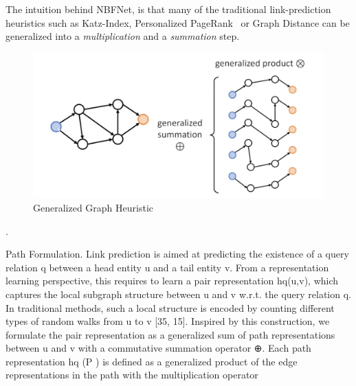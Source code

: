The intuition behind NBFNet, is that many of the traditional link-prediction heuristics such as Katz-Index, Personalized PageRank~\cite{Page1998PageRank} or Graph Distance can be generalized into a
\textit{multiplication} and a \textit{summation} step.

\begin{figure}[h] %
    \centering %
    \includegraphics[width=0.8\linewidth]{figures/nbfnet-trad} %
    \caption{Generalized Graph Heuristic ~\cite{NBfnetPres}} %
    \label{fig:nbfnet-trad} %
\end{figure}.

Path Formulation. Link prediction is aimed at predicting the existence of a query relation q between a head entity u and a tail entity v. From a representation learning perspective, this requires to learn a pair representation hq(u,v), which captures the local subgraph structure between u and v w.r.t. the query relation q. In traditional methods, such a local structure is encoded by counting different types of random walks from u to v [35, 15]. Inspired by this construction, we formulate the pair representation as a generalized sum of path representations between u and v with a commutative summation operator ⊕. Each path representation hq (P ) is defined as a generalized product of the edge representations in the path with the multiplication operator 